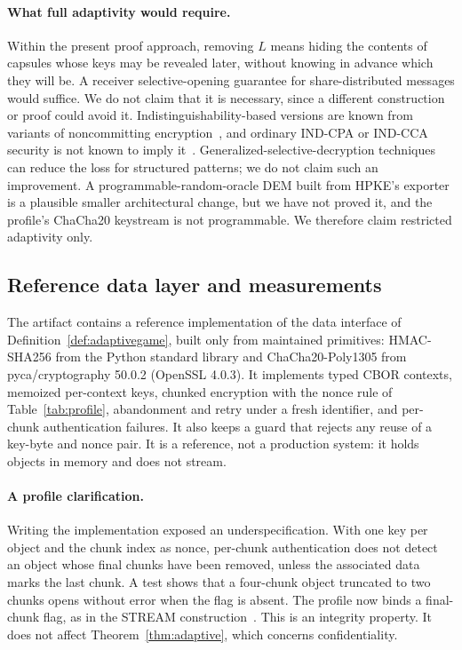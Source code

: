 \documentclass[pdflatex,sn-mathphys-num]{sn-jnl}
\theoremstyle{plain}
\theoremstyle{definition}
\begin{document}
\paragraph{What full adaptivity would require.}
Within the present proof approach, removing $L$ means hiding the contents of capsules whose keys may be revealed later, without knowing in advance which they will be. A receiver selective-opening guarantee for share-distributed messages would suffice. We do not claim that it is necessary, since a different construction or proof could avoid it. Indistinguishability-based versions are known from variants of noncommitting encryption~\cite{hazay2015,canetti1996}, and ordinary IND-CPA or IND-CCA security is not known to imply it~\cite{bellare2009}. Generalized-selective-decryption techniques~\cite{panjwani2007,jafargholi2017} can reduce the loss for structured patterns; we do not claim such an improvement. A programmable-random-oracle DEM built from HPKE's exporter is a plausible smaller architectural change, but we have not proved it, and the profile's ChaCha20 keystream is not programmable. We therefore claim restricted adaptivity only.

\subsection{Reference data layer and measurements}\label{sec:datalayer}
The artifact contains a reference implementation of the data interface of Definition~\ref{def:adaptivegame}, built only from maintained primitives: HMAC-SHA256 from the Python standard library and ChaCha20-Poly1305 from pyca/cryptography 50.0.2 (OpenSSL 4.0.3). It implements typed CBOR contexts, memoized per-context keys, chunked encryption with the nonce rule of Table~\ref{tab:profile}, abandonment and retry under a fresh identifier, and per-chunk authentication failures. It also keeps a guard that rejects any reuse of a key-byte and nonce pair. It is a reference, not a production system: it holds objects in memory and does not stream.

\paragraph{A profile clarification.}
Writing the implementation exposed an underspecification. With one key per object and the chunk index as nonce, per-chunk authentication does not detect an object whose final chunks have been removed, unless the associated data marks the last chunk. A test shows that a four-chunk object truncated to two chunks opens without error when the flag is absent. The profile now binds a final-chunk flag, as in the STREAM construction~\cite{hoang2015}. This is an integrity property. It does not affect Theorem~\ref{thm:adaptive}, which concerns confidentiality.
\end{document}
